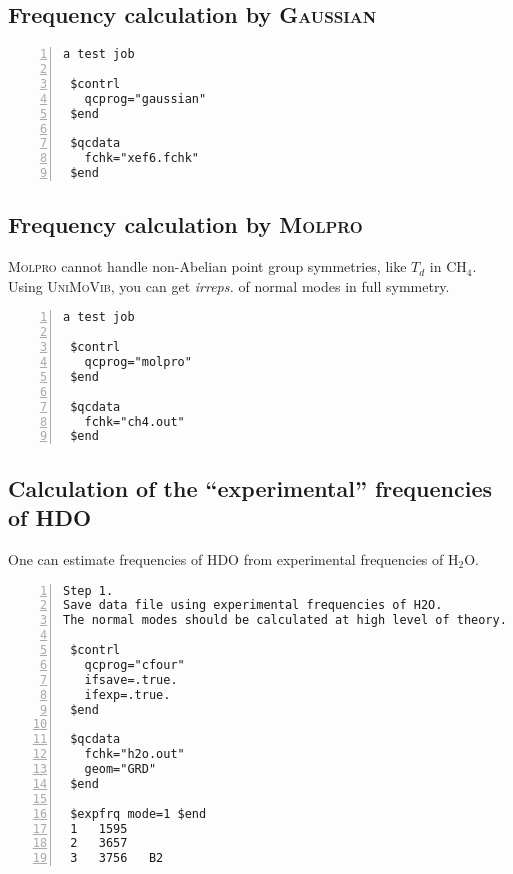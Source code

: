 \documentclass[12pt,english]{extarticle}
\begin{document}
\subsection{Frequency calculation by \textsc{Gaussian}} \label{sec:exp2}

\begin{Verbatim}[frame=single,label=example,labelposition=topline,numbers=left,rulecolor=\color{blue},fontsize=\footnotesize,baselinestretch=1.0]
a test job

 $contrl
   qcprog="gaussian"
 $end

 $qcdata
   fchk="xef6.fchk"
 $end
\end{Verbatim}

\subsection{Frequency calculation by \textsc{Molpro}} \label{sec:exp3}

\textsc{Molpro} cannot handle non-Abelian point group symmetries, like $T_d$ in CH$_4$. Using \textsc{UniMoVib}, you can get \emph{irreps.} of normal modes in full symmetry.

\begin{Verbatim}[frame=single,label=example,labelposition=topline,numbers=left,rulecolor=\color{blue},fontsize=\footnotesize,baselinestretch=1.0]
a test job

 $contrl
   qcprog="molpro"
 $end

 $qcdata
   fchk="ch4.out"
 $end
\end{Verbatim}

\subsection{Calculation of the ``experimental'' frequencies of HDO} \label{sec:exp4}

One can estimate frequencies of HDO from experimental frequencies of H$_2$O.

\begin{Verbatim}[frame=single,label=example,labelposition=topline,numbers=left,rulecolor=\color{blue},fontsize=\footnotesize,baselinestretch=1.0]
Step 1.
Save data file using experimental frequencies of H2O.
The normal modes should be calculated at high level of theory.

 $contrl
   qcprog="cfour"
   ifsave=.true.
   ifexp=.true.
 $end

 $qcdata
   fchk="h2o.out"
   geom="GRD"
 $end

 $expfrq mode=1 $end
 1   1595
 2   3657
 3   3756   B2
\end{Verbatim}
\end{document}
